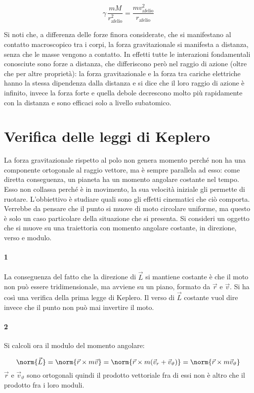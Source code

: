 \[
	\gamma\,\frac{mM}{r_\text{afelio}^2}=\frac{mv_\text{afelio}^2}{r_\text{afelio}}
\]

Si noti che, a differenza delle forze finora considerate, che si manifestano al contatto macroscopico tra i corpi, la forza gravitazionale si manifesta a distanza, senza che le masse vengono a contatto. In effetti tutte le interazioni fondamentali conosciute sono forze a distanza, che differiscono però nel raggio di azione (oltre che per altre proprietà): la forza gravitazionale e la forza tra cariche elettriche hanno la stessa dipendenza dalla distanza e si dice che il loro raggio di azione è infinito, invece la forza forte e quella debole decrescono molto più rapidamente con la distanza e sono efficaci solo a livello subatomico.

\section{Verifica delle leggi di Keplero}

La forza gravitazionale rispetto al polo non genera momento perché non ha una componente ortogonale al raggio vettore, ma è sempre parallela ad esso: come diretta conseguenza, un pianeta ha un momento angolare costante nel tempo. Esso non collassa perché è in movimento, la sua velocità iniziale gli permette di ruotare. L'obbiettivo è studiare quali sono gli effetti cinematici che ciò comporta. Verrebbe da pensare che il punto si muove di moto circolare uniforme, ma questo è solo un caso particolare della situazione che si presenta.
Si consideri un oggetto che si muove su una traiettoria con momento angolare costante, in direzione, verso e modulo.

\paragraph{1} La conseguenza del fatto che la direzione di $\vec{L}$ si mantiene costante è che il moto non può essere tridimensionale, ma avviene su un piano, formato da $\vec{r}$ e $\vec{v}$. Si ha così una verifica della prima legge di Keplero. Il verso di $\vec{L}$ costante vuol dire invece che il punto non può mai invertire il moto.

\paragraph{2} Si calcoli ora il modulo del momento angolare:

\[
	\norm{\vec{L}}=\norm{\vec{r}\times m\vec{v}}=\norm{\vec{r}\times m(\vec{v}_r+\vec{v}_\vartheta)}=\norm{\vec{r}\times m \vec{v}_\vartheta}
\]
$\vec{r}$ e $\vec{v}_\vartheta$ sono ortogonali quindi il prodotto vettoriale fra di essi non è altro che il prodotto fra i loro moduli.

